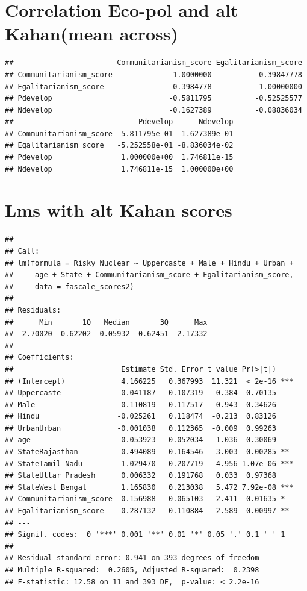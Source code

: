 \documentclass[
]{article}
\begin{document}
\hypertarget{correlation-eco-pol-and-alt-kahanmean-across}{%
\section{Correlation Eco-pol and alt Kahan(mean
across)}\label{correlation-eco-pol-and-alt-kahanmean-across}}

\begin{verbatim}
##                        Communitarianism_score Egalitarianism_score
## Communitarianism_score              1.0000000           0.39847778
## Egalitarianism_score                0.3984778           1.00000000
## Pdevelop                           -0.5811795          -0.52525577
## Ndevelop                           -0.1627389          -0.08836034
##                             Pdevelop      Ndevelop
## Communitarianism_score -5.811795e-01 -1.627389e-01
## Egalitarianism_score   -5.252558e-01 -8.836034e-02
## Pdevelop                1.000000e+00  1.746811e-15
## Ndevelop                1.746811e-15  1.000000e+00
\end{verbatim}

\newpage

\hypertarget{lms-with-alt-kahan-scores}{%
\section{Lms with alt Kahan scores}\label{lms-with-alt-kahan-scores}}

\begin{verbatim}
## 
## Call:
## lm(formula = Risky_Nuclear ~ Uppercaste + Male + Hindu + Urban + 
##     age + State + Communitarianism_score + Egalitarianism_score, 
##     data = fascale_scores2)
## 
## Residuals:
##      Min       1Q   Median       3Q      Max 
## -2.70020 -0.62202  0.05932  0.62451  2.17332 
## 
## Coefficients:
##                         Estimate Std. Error t value Pr(>|t|)    
## (Intercept)             4.166225   0.367993  11.321  < 2e-16 ***
## Uppercaste             -0.041187   0.107319  -0.384  0.70135    
## Male                   -0.110819   0.117517  -0.943  0.34626    
## Hindu                  -0.025261   0.118474  -0.213  0.83126    
## UrbanUrban             -0.001038   0.112365  -0.009  0.99263    
## age                     0.053923   0.052034   1.036  0.30069    
## StateRajasthan          0.494089   0.164546   3.003  0.00285 ** 
## StateTamil Nadu         1.029470   0.207719   4.956 1.07e-06 ***
## StateUttar Pradesh      0.006332   0.191768   0.033  0.97368    
## StateWest Bengal        1.165830   0.213038   5.472 7.92e-08 ***
## Communitarianism_score -0.156988   0.065103  -2.411  0.01635 *  
## Egalitarianism_score   -0.287132   0.110884  -2.589  0.00997 ** 
## ---
## Signif. codes:  0 '***' 0.001 '**' 0.01 '*' 0.05 '.' 0.1 ' ' 1
## 
## Residual standard error: 0.941 on 393 degrees of freedom
## Multiple R-squared:  0.2605, Adjusted R-squared:  0.2398 
## F-statistic: 12.58 on 11 and 393 DF,  p-value: < 2.2e-16
\end{verbatim}
\end{document}
